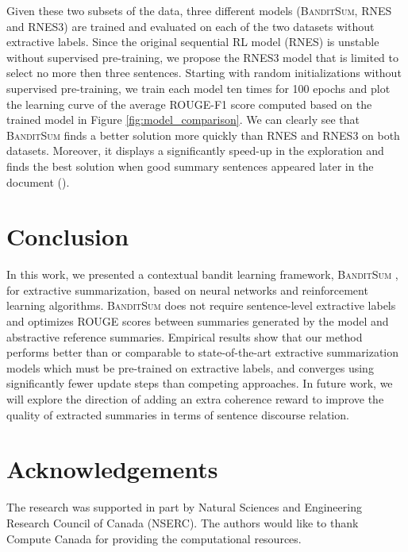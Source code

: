 \documentclass[11pt,a4paper]{article}
\newcommand{\B}{\textsc{BanditSum }}
\newcommand{\Bnospace}{\textsc{BanditSum}}
\begin{document}
Given these two subsets of the data, three different models (\Bnospace, RNES and RNES3) are trained and evaluated on each of the two datasets without extractive labels. Since the original sequential RL model (RNES) is unstable without supervised pre-training, we propose the RNES3 model that is limited to select no more then three sentences. Starting with random initializations without supervised pre-training, we train each model ten times for 100 epochs and plot the learning curve of the average ROUGE-F1 score computed based on the trained model in Figure \ref{fig:model_comparison}. We can clearly see that \B finds a better solution more quickly than RNES and RNES3 on both datasets. Moreover, it displays a significantly speed-up in the exploration and finds the best solution when good summary sentences appeared later in the document ().  








\section{Conclusion \label{sec:conclusion}}
In this work, we presented a contextual bandit learning framework, \B, for extractive summarization, based on neural networks and reinforcement learning algorithms. \B does not require sentence-level extractive labels and optimizes ROUGE scores between summaries generated by the model and abstractive reference summaries. Empirical results show that our method performs better than or comparable to state-of-the-art extractive summarization models which must be pre-trained on extractive labels, and converges using significantly fewer update steps than competing approaches. In future work, we will explore the direction of adding an extra coherence reward \citep{DBLP:conf/aaai/WuH18} to improve the quality of extracted summaries in terms of sentence discourse relation. 




\section*{Acknowledgements}
The research was supported in part by Natural Sciences and Engineering Research Council of Canada (NSERC). The authors would like to thank Compute Canada for providing the computational resources.





\onecolumn
\end{document}
